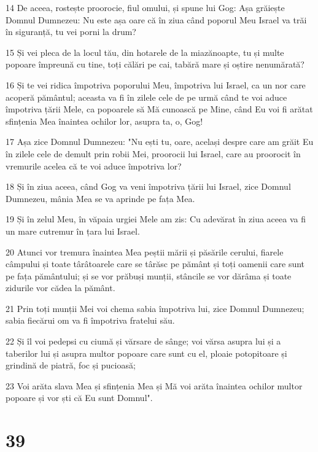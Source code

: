 \par 14 De aceea, rostește proorocie, fiul omului, și spune lui Gog: Așa grăiește Domnul Dumnezeu: Nu este așa oare că în ziua când poporul Meu Israel va trăi în siguranță, tu vei porni la drum?
\par 15 Și vei pleca de la locul tău, din hotarele de la miazănoapte, tu și multe popoare împreună cu tine, toți călări pe cai, tabără mare și oștire nenumărată?
\par 16 Și te vei ridica împotriva poporului Meu, împotriva lui Israel, ca un nor care acoperă pământul; aceasta va fi în zilele cele de pe urmă când te voi aduce împotriva țării Mele, ca popoarele să Mă cunoască pe Mine, când Eu voi fi arătat sfințenia Mea înaintea ochilor lor, asupra ta, o, Gog!
\par 17 Așa zice Domnul Dumnezeu: "Nu ești tu, oare, același despre care am grăit Eu în zilele cele de demult prin robii Mei, proorocii lui Israel, care au proorocit în vremurile acelea că te voi aduce împotriva lor?
\par 18 Și în ziua aceea, când Gog va veni împotriva țării lui Israel, zice Domnul Dumnezeu, mânia Mea se va aprinde pe fața Mea.
\par 19 Și în zelul Meu, în văpaia urgiei Mele am zis: Cu adevărat în ziua aceea va fi un mare cutremur în țara lui Israel.
\par 20 Atunci vor tremura înaintea Mea peștii mării și păsările cerului, fiarele câmpului și toate târâtoarele care se târăsc pe pământ și toți oamenii care sunt pe fața pământului; și se vor prăbuși munții, stâncile se vor dărâma și toate zidurile vor cădea la pământ.
\par 21 Prin toți munții Mei voi chema sabia împotriva lui, zice Domnul Dumnezeu; sabia fiecărui om va fi împotriva fratelui său.
\par 22 Și îl voi pedepsi cu ciumă și vărsare de sânge; voi vărsa asupra lui și a taberilor lui și asupra multor popoare care sunt cu el, ploaie potopitoare și grindină de piatră, foc și pucioasă;
\par 23 Voi arăta slava Mea și sfințenia Mea și Mă voi arăta înaintea ochilor multor popoare și vor ști că Eu sunt Domnul".

\chapter{39}

